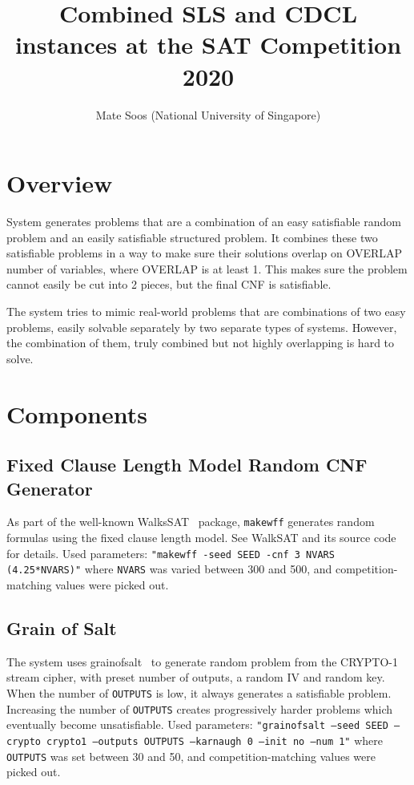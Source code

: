 \documentclass[final]{ieee}
\begin{document}
\title{Combined SLS and CDCL instances at the SAT Competition 2020}
\author{Mate Soos (National University of Singapore)}

\maketitle
\thispagestyle{empty}
\pagestyle{empty}



\section{Overview}
System generates problems that are a combination of an easy satisfiable random problem and an easily satisfiable structured problem. It combines these two satisfiable problems in a way to make sure their solutions overlap on OVERLAP number of variables, where OVERLAP is at least 1. This makes sure the problem cannot easily be cut into 2 pieces, but the final CNF is satisfiable.

The system tries to mimic real-world problems that are combinations of two easy problems, easily solvable separately by two separate types of systems. However, the combination of them, truly combined but not highly overlapping is hard to solve.


\section{Components}


\subsection{Fixed Clause Length Model Random CNF Generator}

As part of the well-known WalksSAT~\cite{Selman95localsearch} package, \texttt{makewff} generates random formulas using the fixed clause length model. See WalkSAT and its source code for details. Used parameters: \texttt{"makewff -seed SEED -cnf 3 NVARS (4.25*NVARS)"} where \texttt{NVARS} was varied between 300 and 500, and competition-matching values were picked out.

\subsection{Grain of Salt}
The system uses grainofsalt~\cite{soos2010grain} to generate random problem from the CRYPTO-1 stream cipher, with preset number of outputs, a random IV and random key. When the number of \texttt{OUTPUTS} is low, it always generates a satisfiable problem. Increasing the number of \texttt{OUTPUTS} creates progressively harder problems which eventually become unsatisfiable. Used parameters: \texttt{"grainofsalt --seed SEED --crypto crypto1 --outputs OUTPUTS --karnaugh 0 --init no --num 1"} where \texttt{OUTPUTS} was set between 30 and 50, and competition-matching values were picked out.
\end{document}
